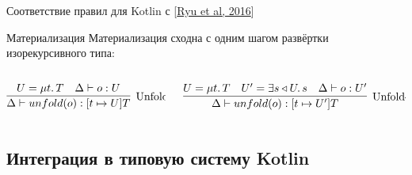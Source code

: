 \documentclass[handout,aspectratio=169,usenames,dvipsnames]{beamer}
\begin{document}
\begin{frame}{Соответствие правил для Kotlin с [\href{https://dl.acm.org/doi/pdf/10.1145/2888392}{Ryu et al, 2016}]}
        \begin{block}{Материализация}
            Материализация сходна с одним шагом развёртки изорекурсивного типа:
            \vspace{-1em}
            \begin{columns}[onlytextwidth]
                \begin{column}[t]{0.41\textwidth}
                    \[
                        \infer[\text{Unfold-Self}]{
                            \Delta \vdash unfold(o) : [t \mapsto U]T
                        }{
                            U = \mu t \ldotp T & \Delta \vdash o : U
                        }
                    \]
                \end{column}\hfill%
                \begin{column}[t]{0.58\textwidth}
                    \[
                        \infer[\text{Unfold-NoSelf}]{
                            \Delta \vdash unfold(o) : [t \mapsto U']T
                        }{
                            U = \mu t \ldotp T
                            &
                            U' = \exists s \triangleleft U \ldotp s
                            &
                            \Delta \vdash o : U'
                        }
                    \]
                \end{column}
            \end{columns}
        \end{block}
    \end{frame}


    \subsection{Интеграция в типовую систему Kotlin}
\end{document}
